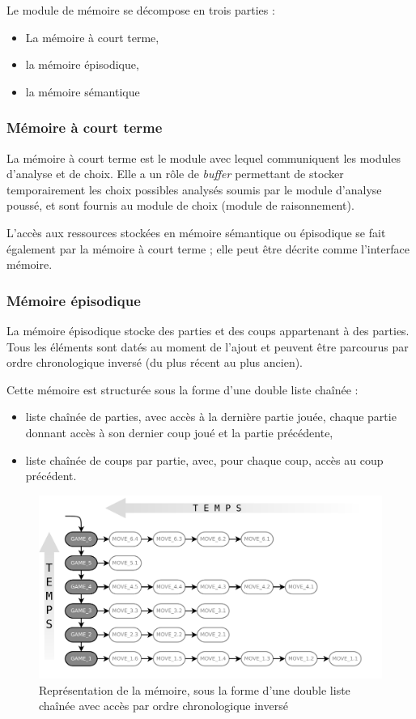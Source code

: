 Le module de mémoire se décompose en trois parties :
\begin{itemize}
\item La mémoire à court terme,
\item la mémoire épisodique,
\item la mémoire sémantique
\end{itemize}

\subsubsection{Mémoire à court terme}

La mémoire à court terme est le module avec lequel communiquent les modules d'analyse et de choix. Elle a un rôle de \emph{buffer} permettant de stocker temporairement les choix possibles analysés soumis par le module d'analyse poussé, et sont fournis au module de choix (module de raisonnement).

L'accès aux ressources stockées en mémoire sémantique ou épisodique se fait également par la mémoire à court terme ; elle peut être décrite comme l'interface mémoire.

\subsubsection{Mémoire épisodique}

La mémoire épisodique stocke des parties et des coups appartenant à des parties. Tous les éléments sont datés au moment de l'ajout et peuvent être parcourus par ordre chronologique inversé (du plus récent au plus ancien).

Cette mémoire est structurée sous la forme d'une double liste chaînée :
\begin{itemize}
\item liste chaînée de parties, avec accès à la dernière partie jouée, chaque partie donnant accès à son dernier coup joué et la partie précédente,
\item liste chaînée de coups par partie, avec, pour chaque coup, accès au coup précédent.
\end{itemize}

\begin{figure}[H]
\includegraphics[width=\textwidth]{files/memoire/episodic_general}
\caption{Représentation de la mémoire, sous la forme d'une double liste chaînée avec accès par ordre chronologique inversé}
\end{figure}

